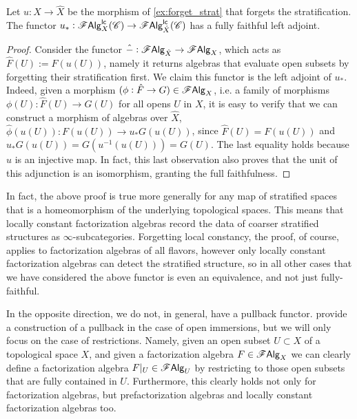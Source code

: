 \documentclass[../text]{subfiles}
\begin{document}
\begin{lemma}\label{lem:ff_functor_to_refinement}
    Let $u: X \rightarrow \hat{X}$ be the morphism of \cref{ex:forget_strat} that forgets the stratification.
    The functor $u_*: \mathscr{F} \mathsf{Alg}^{\mathsf{lc}}_{X} (\mathscr{C}) \rightarrow \mathscr{F} \mathsf{Alg}^{\mathsf{lc}}_{\hat{X}} (\mathscr{C})$ has a fully faithful left adjoint.
\end{lemma}

\begin{proof}
    Consider the functor $\hat{-}: \mathscr{F} \mathsf{Alg}_{\hat{X}} \rightarrow \mathscr{F} \mathsf{Alg}_{X}$, which acts as $\hat{F}(U) := F(u(U))$, namely it returns algebras that evaluate open subsets by forgetting their stratification first. We claim this functor is the left adjoint of $u_*$. Indeed, given a morphism $(\phi: \hat{F} \rightarrow G) \in \mathscr{F} \mathsf{Alg}_{X}$, i.e. a family of morphisms $\phi(U): \hat{F}(U) \rightarrow G(U)$ for all opens $U$ in $X$, it is easy to verify that we can construct a morphism of algebras over $\hat{X}$, $\hat{\phi}(u(U)): F(u(U)) \rightarrow u_*G (u(U))$, since $\hat{F}(U) = F(u(U))$ and $u_*G(u(U)) = G(u^{-1}(u(U))) = G(U)$. The last equality holds because $u$ is an injective map. In fact, this last observation also proves that the unit of this adjunction is an isomorphism, granting the full faithfulness.
\end{proof}

\begin{remark}
    In fact, the above proof is true more generally for any map of stratified spaces that is a homeomorphism of the underlying topological spaces. This means that locally constant factorization algebras record the data of coarser stratified structures as $\infty$-subcategories. Forgetting local constancy, the proof, of course, applies to factorization algebras of all flavors, however only locally constant factorization algebras can detect the stratified structure, so in all other cases that we have considered the above functor is even an equivalence, and not just fully-faithful.
\end{remark}


In the opposite direction, we do not, in general, have a pullback functor. \cite{cg2016} provide a construction of a pullback in the case of open immersions, but we will only focus on the case of restrictions. Namely, given an open subset $U \subset X$ of a topological space $X$, and given a factorization algebra $F \in \mathscr{F} \mathsf{Alg}_X$ we can clearly define a factorization algebra $F|_{U} \in \mathscr{F} \mathsf{Alg}_U$ by restricting to those open subsets that are fully contained in $U$. Furthermore, this clearly holds not only for factorization algebras, but prefactorization algebras and locally constant factorization algebras too.
\end{document}
